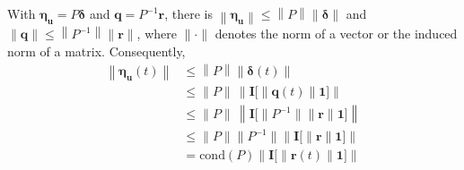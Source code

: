 \documentclass[accepted]{uai2023}
\newcommand{\vect}[1]{\mathbf{#1}}
\newcommand{\Err}{\eta}
\begin{document}
    With $\pmb{\Err}_{\vect{u}} = P \pmb{\delta}$ and $\vect{q} = P^{-1}\vect{r}$, there is $\left\|\pmb{\Err}_{\vect{u}}\right\| \leq \left\|P\right\| \|\pmb{\delta}\|$ and $\|\vect{q}\| \leq \left\|P^{-1}\right\| \|\vect{r}\|$, where $\|\cdot\|$ denotes the norm of a vector or the induced norm of a matrix. Consequently,
    \begin{align}
        \left\|\pmb{\Err}_{\vect{u}}(t)\right\| &\leq \left\|P\right\| \|\pmb{\delta}(t)\| \\
        &\leq \|P\|\, \left\|\vect{I}\Big[\|\vect{q}(t)\|\vect{1}\Big]\right\|\\
        &\leq \|P\|\, \left\|\vect{I}\Big[\|P^{-1}\| \|\vect{r}\|\vect{1}\Big]\right\|\\
        &\leq \|P\|\|P^{-1}\| \left\|\vect{I}\Big[\|\vect{r}\|\vect{1}\Big]\right\|\\
        &=\mathrm{cond}(P)\left\|\vect{I}\Big[\|\vect{r}(t)\|\vect{1}\Big]\right\| 
    \end{align}

    
\end{document}
